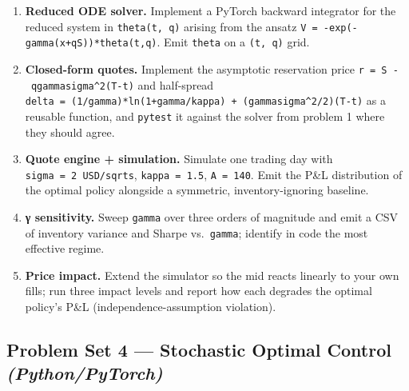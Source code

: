 \documentclass[
]{article}
\providecommand{\tightlist}{%
  \setlength{\itemsep}{0pt}\setlength{\parskip}{0pt}}
\begin{document}
\begin{enumerate}
\def\labelenumi{\arabic{enumi}.}
\tightlist
\item
  \textbf{Reduced ODE solver.} Implement a PyTorch backward integrator
  for the reduced system in \texttt{theta(t,\ q)} arising from the
  ansatz \texttt{V\ =\ -exp(-gamma(x+qS))*theta(t,q)}. Emit
  \texttt{theta} on a \texttt{(t,\ q)} grid.
\item
  \textbf{Closed-form quotes.} Implement the asymptotic reservation
  price \texttt{r\ =\ S\ -\ qgammasigma\^{}2(T-t)} and half-spread
  \texttt{delta\ =\ (1/gamma)*ln(1+gamma/kappa)\ +\ (gammasigma\^{}2/2)(T-t)}
  as a reusable function, and \texttt{pytest} it against the solver from
  problem 1 where they should agree.
\item
  \textbf{Quote engine + simulation.} Simulate one trading day with
  \texttt{sigma\ =\ 2\ USD/sqrts}, \texttt{kappa\ =\ 1.5},
  \texttt{A\ =\ 140}. Emit the P\&L distribution of the optimal policy
  alongside a symmetric, inventory-ignoring baseline.
\item
  \textbf{γ sensitivity.} Sweep \texttt{gamma} over three orders of
  magnitude and emit a CSV of inventory variance and Sharpe
  vs.~\texttt{gamma}; identify in code the most effective regime.
\item
  \textbf{Price impact.} Extend the simulator so the mid reacts linearly
  to your own fills; run three impact levels and report how each
  degrades the optimal policy's P\&L (independence-assumption
  violation).
\end{enumerate}

\subsection{\texorpdfstring{Problem Set 4 --- Stochastic Optimal Control
\emph{(Python/PyTorch)}}{Problem Set 4 --- Stochastic Optimal Control (Python/PyTorch)}}\label{problem-set-4-stochastic-optimal-control-pythonpytorch}
\end{document}

